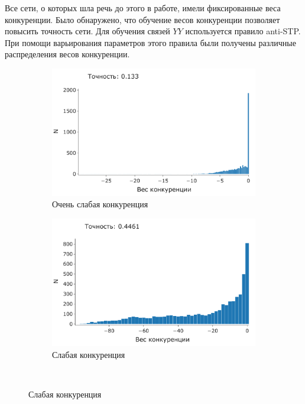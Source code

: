 \documentclass[a4paper]{article}
\begin{document}
Все сети, о которых шла речь до этого в работе, имели фиксированные веса конкуренции. Было обнаружено, что обучение весов конкуренции позволяет повысить точность сети. Для обучения связей $YY$ используется правило anti-STP. При помощи варьирования параметров этого правила были получены различные распределения весов конкуренции.

\begin{figure}[H]
\centering
\begin{subfigure}{0.45\textwidth}
    \includegraphics[width=\textwidth,keepaspectratio=true]{competition_distribution_worst_ru.pdf}
    \caption{Очень слабая конкуренция}
\end{subfigure}
\begin{subfigure}{0.45\textwidth}
    \includegraphics[width=\textwidth,keepaspectratio=true]{competition_distribution_medium_bad_ru.pdf}
    \caption{Слабая конкуренция}
\end{subfigure}
\\

\end{figure}
\end{document}
